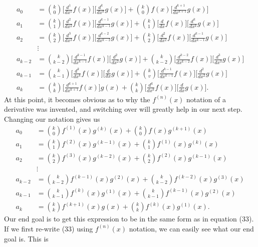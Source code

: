\begin{align}
	a_0&={{k}\choose{0}}\bigg[\frac{d^{1}}{dx^{1}}f(x) \bigg]\bigg[\frac{d^{k}}{dx^{k}}g(x) \bigg]+{{k}\choose{0}}f(x)\bigg[\frac{d^{k+1}}{dx^{k+1}}g(x) \bigg] \\
	a_1&={{k}\choose{1}}\bigg[\frac{d^{2}}{dx^{2}}f(x) \bigg]\bigg[\frac{d^{k-1}}{dx^{k-1}}g(x) \bigg]+{{k}\choose{1}}\bigg[\frac{d}{dx}f(x) \bigg]\bigg[\frac{d^{k}}{dx^{k}}g(x) \bigg] \\
	a_2&={{k}\choose{2}}\bigg[\frac{d^{3}}{dx^{3}}f(x) \bigg]\bigg[\frac{d^{k-2}}{dx^{k-2}}g(x) \bigg]+{{k}\choose{2}}\bigg[\frac{d^2}{dx^2}f(x) \bigg]\bigg[\frac{d^{k-1}}{dx^{k-1}}g(x) \bigg]\\
	&\vdots \\
	a_{k-2}&={{k}\choose{k-2}}\bigg[\frac{d^{k-1}}{dx^{k-1}}f(x) \bigg]\bigg[\frac{d^{2}}{dx^{2}}g(x) \bigg]+{{k}\choose{k-2}}\bigg[\frac{d^{k-2}}{dx^{k-2}}f(x) \bigg]\bigg[\frac{d^{3}}{dx^{3}}g(x) \bigg]\\
	a_{k-1}&={{k}\choose{k-1}}\bigg[\frac{d^{k}}{dx^{k}}f(x) \bigg]\bigg[\frac{d}{dx}g(x) \bigg]+{{k}\choose{v}}\bigg[\frac{d^{k-1}}{dx^{k-1}}f(x) \bigg]\bigg[\frac{d^{2}}{dx^{2}}g(x) \bigg]\\
	a_k&={{k}\choose{k}}\bigg[\frac{d^{k+1}}{dx^{k+1}}f(x) \bigg]g(x)+{{k}\choose{k}}\bigg[\frac{d^k}{dx^k}f(x) \bigg]\bigg[\frac{d}{dx}g(x) \bigg].
\end{align}
At this point, it becomes obvious as to why the $f^{(n)}(x)$ notation of a derivative was invented, and switching over will greatly help in our next step. Changing our notation gives us 
\begin{align}
	a_0&={{k}\choose{0}}f^{(1)}(x) g^{(k)}(x)+{{k}\choose{0}}f(x)g^{(k+1)}(x) \\
	a_1&={{k}\choose{1}}f^{(2)}(x) g^{(k-1)}(x) +{{k}\choose{1}}f^{(1)}(x) g^{(k)}(x) \\
	a_2&={{k}\choose{2}}f^{(3)}(x) g^{(k-2)}(x) +{{k}\choose{2}}f^{(2)}(x) g^{(k-1)}(x) \\
	&\vdots \\
	a_{k-2}&={{k}\choose{k-2}}f^{(k-1)}(x) g^{(2)}(x) +{{k}\choose{k-2}}f^{(k-2)}(x) g^{(3)}(x)\\
	a_{k-1}&={{k}\choose{k-1}}f^{(k)}(x) g^{(1)}(x)+{{k}\choose{k-1}}f^{(k-1)}(x) g^{(2)}(x)\\
	a_k&={{k}\choose{k}}f^{(k+1)}(x) g(x)+{{k}\choose{k}}f^{(k)}(x)g^{(1)}(x).
\end{align}
Our end goal is to get this expression to be in the same form as in equation (33). If we first re-write (33) using $f^{(n)}(x)$ notation, we can easily see what our end goal is. This is
